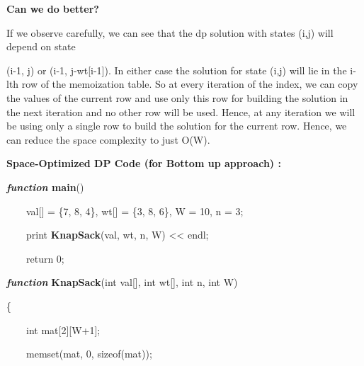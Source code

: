 \documentclass[letterpaper]{article}
\begin{document}
\begin{multicols}{2}
{\bfseries
Can we do better? }

If we observe carefully, we can see that the dp solution with states (i,j) will depend on state 

(i-1, j) or (i-1, j-wt[i-1]). In either case the solution for state (i,j) will lie in the i-lth row of the memoization
table. So at every iteration of the index, we can copy the values of the current row and use only this row for building
the solution in the next iteration and no other row will be used. Hence, at any iteration we will be using only a
single row to build the solution for the current row. Hence, we can reduce the space complexity to just O(W).


\bigskip


\bigskip


\bigskip

\textbf{Space-Optimized DP Code (for Bottom up approach) :} 


\bigskip


\bigskip

\textbf{\textit{\textcolor[rgb]{0.2509804,0.25882354,0.30588236}{function}}}\textbf{\textcolor[rgb]{0.2509804,0.25882354,0.30588236}{
main}}\textcolor[rgb]{0.2509804,0.25882354,0.30588236}{()}

{\color[rgb]{0.2509804,0.25882354,0.30588236}
\ \ \ \ val[] = \{7, 8, 4\}, wt[] = \{3, 8, 6\}, W = 10, n = 3;}

\textcolor[rgb]{0.2509804,0.25882354,0.30588236}{\ \ \ \ print
}\textbf{\textcolor[rgb]{0.2509804,0.25882354,0.30588236}{KnapSack}}\textcolor[rgb]{0.2509804,0.25882354,0.30588236}{(val,
wt, n, W) {\textless}{\textless} endl;}

{\color[rgb]{0.2509804,0.25882354,0.30588236}
\ \ \ \ return 0;}


\bigskip

\textbf{\textit{\textcolor[rgb]{0.2509804,0.25882354,0.30588236}{function}}}\textcolor[rgb]{0.2509804,0.25882354,0.30588236}{
}\textbf{\textcolor[rgb]{0.2509804,0.25882354,0.30588236}{KnapSack}}\textcolor[rgb]{0.2509804,0.25882354,0.30588236}{(int
val[], int wt[], int n, int W)}

{\color[rgb]{0.2509804,0.25882354,0.30588236}
\{}

{\color[rgb]{0.2509804,0.25882354,0.30588236}
\ \ \ \ int mat[2][W+1];}

{\color[rgb]{0.2509804,0.25882354,0.30588236}
\ \ \ \ memset(mat, 0, sizeof(mat));}


\bigskip


\end{multicols}
\end{document}
